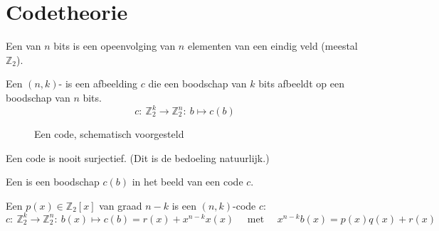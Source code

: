 \documentclass[main.tex]{subfiles}
\begin{document}


\section{Codetheorie}
\label{sec:codetheorie}

\begin{de}
  Een  van $n$ bits is een opeenvolging van $n$ elementen van een eindig veld (meestal $\mathbb{Z}_{2}$).
\end{de}

\begin{de}
  \label{de:code}
  Een $(n,k)$- is een afbeelding $c$ die een boodschap van $k$ bits afbeeldt op een boodschap van $n$ bits.
  \[ c:\ \mathbb{Z}_{2}^{k} \rightarrow \mathbb{Z}_{2}^{n}:\ b \mapsto c(b) \]

  \begin{figure}[H]
    \centering
    \caption{Een code, schematisch voorgesteld}
    \label{fig:code}
  \end{figure}
\end{de}

\begin{opm}
  Een code is nooit surjectief. (Dit is de bedoeling natuurlijk.)
\end{opm}

\begin{de}
  Een  is een boodschap $c(b)$ in het beeld van een code $c$.
\end{de}

\begin{de}
  Een  $p(x)\in \mathbb{Z}_{2}[x]$ van graad $n-k$ is een $(n,k)$-code $c$:
  \[ c:\ \mathbb{Z}_{2}^{k} \rightarrow \mathbb{Z}_{2}^{n}:\ b(x) \mapsto c(b) = r(x) + x^{n-k}x(x) \quad\text{ met }\quad x^{n-k}b(x) = p(x)q(x) + r(x) \]
\end{de}
\end{document}
